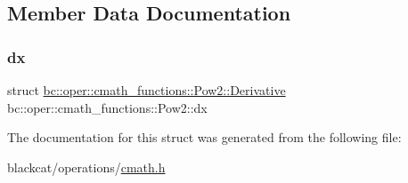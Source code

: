 \subsection{Member Data Documentation}
\mbox{\label{structbc_1_1oper_1_1cmath__functions_1_1Pow2_a1fc55691db97f9b427695ab14c1d4b13}} 
\subsubsection{\texorpdfstring{dx}{dx}}
{\footnotesize\ttfamily struct \hyperlink{structbc_1_1oper_1_1cmath__functions_1_1Pow2_1_1Derivative}{bc\+::oper\+::cmath\+\_\+functions\+::\+Pow2\+::\+Derivative}   bc\+::oper\+::cmath\+\_\+functions\+::\+Pow2\+::dx}



The documentation for this struct was generated from the following file\+:\begin{DoxyCompactItemize}
\item 
blackcat/operations/\hyperlink{cmath_8h}{cmath.\+h}\end{DoxyCompactItemize}
